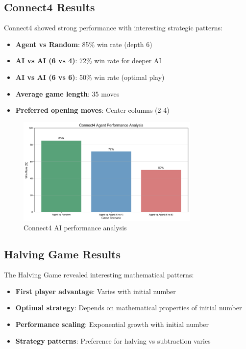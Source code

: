 \documentclass[12pt]{article}
\begin{document}
\subsection{Connect4 Results}

Connect4 showed strong performance with interesting strategic patterns:
\begin{itemize}
    \item \textbf{Agent vs Random}: 85\% win rate (depth 6)
    \item \textbf{AI vs AI (6 vs 4)}: 72\% win rate for deeper AI
    \item \textbf{AI vs AI (6 vs 6)}: 50\% win rate (optimal play)
    \item \textbf{Average game length}: 35 moves
    \item \textbf{Preferred opening moves}: Center columns (2-4)
\end{itemize}

\begin{figure}[H]
\centering
\includegraphics[width=0.8\textwidth]{output/images/connect4_win_rates.png}
\caption{Connect4 AI performance analysis}
\label{fig:connect4_win_rates}
\end{figure}

\subsection{Halving Game Results}

The Halving Game revealed interesting mathematical patterns:
\begin{itemize}
    \item \textbf{First player advantage}: Varies with initial number
    \item \textbf{Optimal strategy}: Depends on mathematical properties of initial number
    \item \textbf{Performance scaling}: Exponential growth with initial number
    \item \textbf{Strategy patterns}: Preference for halving vs subtraction varies
\end{itemize}
\end{document}
